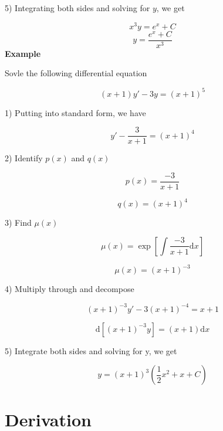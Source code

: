 \documentclass{article}
\begin{document}
5) Integrating both sides and solving for $y$, we get

$$ x^3y = e^x + C $$
\begin{equation}
 \boxed{y = \frac{e^x + C}{x^3}}
\end{equation}
\textbf{Example}

Sovle the following differential equation

$$ \left( x + 1 \right) y' - 3 y = \left( x + 1 \right)^5 $$ 

1) Putting into standard form, we have 

$$ y' - \frac{3}{x+1} = \left( x + 1 \right)^4 $$ 

2) Identify $ p\left(x\right) $ and $ q\left(x\right) $

$$ p\left(x\right) = \frac{-3}{x+1} $$

$$ q\left(x \right) = \left(x+1\right)^4 $$

3) Find $ \mu\left( x \right) $

$$ \mu \left( x \right) = \exp\left[ \int \frac{-3}{x+1} \mathrm{d}x \right] $$

$$ \mu \left( x \right) = \left( x + 1 \right) ^{-3} $$

4) Multiply through and decompose

$$ \left( x + 1 \right)^{-3}y' - 3 \left( x + 1 \right)^{-4} = x + 1 $$

$$ \mathrm{d}\left[ \left( x + 1 \right)^{-3} y \right] = \left( x + 1 \right) \mathrm{d}x $$

5) Integrate both sides and solving for y, we get 

\begin{equation}
    \boxed{y = \left( x + 1 \right)^{3}\left( \frac{1}{2}x^2 + x + C \right)}
\end{equation}

\section{Derivation}
\end{document}
